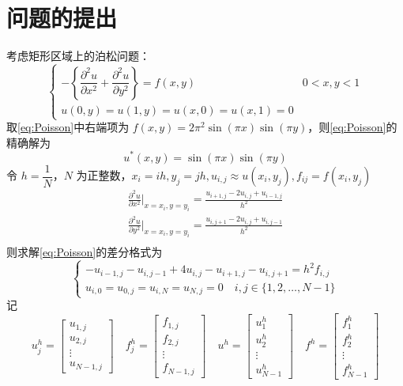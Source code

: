\documentclass{article}
\begin{document}
\section{问题的提出}
考虑矩形区域上的泊松问题：
\begin{equation}
    \begin{cases}
        -\left\{\dfrac{\partial^2u}{\partial x^2}+\dfrac{\partial^2u}{\partial y^2}\right\}=f(x,y)&0<x,y<1\\
        u(0,y)=u(1,y)=u(x,0)=u(x,1)=0
    \end{cases}\label{eq:Poisson}
\end{equation}
取\eqref{eq:Poisson}中右端项为 $f(x,y)=2\pi^2\sin(\pi x)\sin(\pi y)$，则\eqref{eq:Poisson}的精确解为
\begin{equation*}
    u^*(x,y)=\sin(\pi x)\sin(\pi y)
\end{equation*}
令 $h=\dfrac{1}{N}$，$N$ 为正整数，$x_i=ih,y_j=jh,u_{i,j}\approx u(x_i,y_j),f_{ij}=f(x_i,y_j)$
\begin{equation*}
    \begin{aligned}
        \frac{\partial^2u}{\partial x^2}\bigg|_{x=x_i,y=y_i}=\frac{u_{i+1,j}-2u_{i,j}+u_{i-1,j}}{h^2}\\
        \frac{\partial^2u}{\partial y^2}\bigg|_{x=x_i,y=y_i}=\frac{u_{i,j+1}-2u_{i,j}+u_{i,j-1}}{h^2}\\
    \end{aligned}
\end{equation*}
则求解\eqref{eq:Poisson}的差分格式为
\begin{equation}
    \begin{cases}
        -u_{i-1,j}-u_{i,j-1}+4u_{i,j}-u_{i+1,j}-u_{i,j+1}=h^2f_{i,j}\\
        u_{i,0}=u_{0,j}=u_{i,N}=u_{N,j}=0\quad i, j\in\{1,2,\dots,N-1\}
    \end{cases}\label{eq:Descrete}
\end{equation}
记
\begin{equation*}
    u^h_j=\begin{bmatrix}u_{1,j}\\u_{2,j}\\\vdots\\u_{N-1,j}\end{bmatrix}\quad
    f^h_j=\begin{bmatrix}f_{1,j}\\f_{2,j}\\\vdots\\f_{N-1,j}\end{bmatrix}\quad
    u^h=\begin{bmatrix}u^h_1\\u^h_2\\\vdots\\u^h_{N-1}\end{bmatrix}\quad
    f^h=\begin{bmatrix}f^h_1\\f^h_2\\\vdots\\f^h_{N-1}\end{bmatrix}
\end{equation*}
\end{document}
